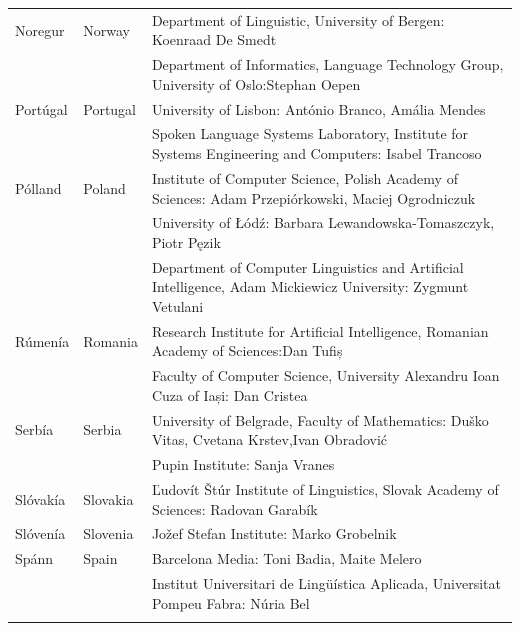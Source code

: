 \begin{longtable}{llp{105mm}}
  Noregur & \textcolor{grey1}{Norway} & Department of Linguistic, University of Bergen: Koenraad De Smedt\\ \addlinespace 
  & & Department of Informatics, Language Technology Group, University of Oslo:\newline Stephan Oepen \\ \addlinespace
  Portúgal & \textcolor{grey1}{Portugal} & University of Lisbon: António Branco, Amália Mendes \\ \addlinespace
  & & Spoken Language Systems Laboratory, Institute for Systems Engineering and Computers: Isabel Trancoso \\ \addlinespace
  Pólland & \textcolor{grey1}{Poland} & Institute of Computer Science, Polish Academy of Sciences: \newline Adam Przepiórkowski, Maciej Ogrodniczuk \\ \addlinespace
  & & University of Łódź: Barbara Lewandowska-Tomaszczyk, Piotr Pęzik\\ \addlinespace
  & & Department of Computer Linguistics and Artificial Intelligence, Adam Mickiewicz University: Zygmunt Vetulani \\ \addlinespace
   Rúmenía & \textcolor{grey1}{Romania} & Research Institute for Artificial Intelligence, Romanian Academy of Sciences:\newline Dan Tufiș \\ \addlinespace
  & & Faculty of Computer Science, University Alexandru Ioan Cuza of Iași: \newline Dan Cristea \\ \addlinespace
  Serbía & \textcolor{grey1}{Serbia} & University of Belgrade, Faculty of Mathematics: Duško Vitas, Cvetana Krstev,\newline Ivan Obradović \\ \addlinespace
  & & Pupin Institute: Sanja Vranes \\ \addlinespace  
  Slóvakía & \textcolor{grey1}{Slovakia} & Ľudovít Štúr Institute of Linguistics, Slovak Academy of Sciences: \newline Radovan Garabík \\ \addlinespace 
  Slóvenía & \textcolor{grey1}{Slovenia} & Jožef Stefan Institute: Marko Grobelnik \\ \addlinespace 
  Spánn & \textcolor{grey1}{Spain} & Barcelona Media: Toni Badia, Maite Melero \\ \addlinespace 
  & & Institut Universitari de Lingüística Aplicada, Universitat Pompeu Fabra: \newline Núria Bel \\ \addlinespace 

\end{longtable}
